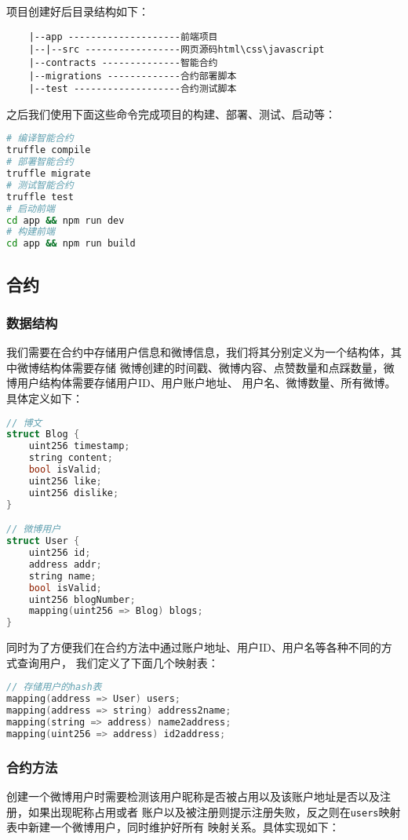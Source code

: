 \documentclass[bwprint]{hfutreport}
\begin{document}
项目创建好后目录结构如下：
\begin{verbatim}
    |--app --------------------前端项目
    |--|--src -----------------网页源码html\css\javascript
    |--contracts --------------智能合约
    |--migrations -------------合约部署脚本
    |--test -------------------合约测试脚本    
\end{verbatim}

\newpage
之后我们使用下面这些命令完成项目的构建、部署、测试、启动等：
\begin{lstlisting}[language=bash]
# 编译智能合约
truffle compile
# 部署智能合约
truffle migrate
# 测试智能合约
truffle test
# 启动前端
cd app && npm run dev
# 构建前端
cd app && npm run build
\end{lstlisting}

\subsection{合约}
\subsubsection{数据结构}
我们需要在合约中存储用户信息和微博信息，我们将其分别定义为一个结构体，其中微博结构体需要存储
微博创建的时间戳、微博内容、点赞数量和点踩数量，微博用户结构体需要存储用户ID、用户账户地址、
用户名、微博数量、所有微博。具体定义如下：

\begin{lstlisting}[language=c]
// 博文
struct Blog {
    uint256 timestamp;
    string content;
    bool isValid;
    uint256 like;
    uint256 dislike;
}

// 微博用户
struct User {
    uint256 id;
    address addr;
    string name;
    bool isValid;
    uint256 blogNumber;
    mapping(uint256 => Blog) blogs;
}
\end{lstlisting}

同时为了方便我们在合约方法中通过账户地址、用户ID、用户名等各种不同的方式查询用户，
我们定义了下面几个映射表：

\begin{lstlisting}[language=c]
// 存储用户的hash表
mapping(address => User) users;
mapping(address => string) address2name;
mapping(string => address) name2address;
mapping(uint256 => address) id2address;
\end{lstlisting}

\subsubsection{合约方法}
创建一个微博用户时需要检测该用户昵称是否被占用以及该账户地址是否以及注册，如果出现昵称占用或者
账户以及被注册则提示注册失败，反之则在\verb|users|映射表中新建一个微博用户，同时维护好所有
映射关系。具体实现如下：
\end{document}
